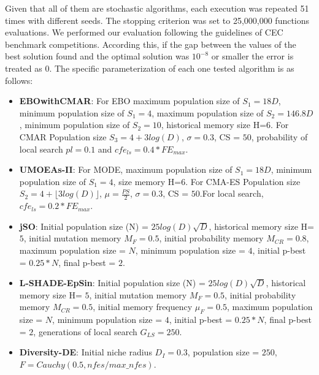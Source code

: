 Given that all of them are stochastic algorithms, each execution was repeated 51 times with different seeds.
%
The stopping criterion was set to 25,000,000 functions evaluations.
%
We performed our evaluation following the guidelines of CEC benchmark competitions.
%
According this, if the gap between the values of the best solution found and the optimal solution was $10^{-8}$ or smaller the error is treated as $0$.
%
%
The specific parameterization of each one tested algorithm is as follows:
\begin{itemize}
\item \textbf{EBOwithCMAR}: For EBO maximum population size of $S_1 = 18D$, minimum population size of $S_1 = 4$, maximum population size of $S_2 = 146.8D$, minimum population size of $S_2 = 10$, historical memory size H=$6$. For CMAR Population size $S_3 = 4 + 3log(D)$, $\sigma=0.3$, CS = $50$, probability of local search $pl = 0.1$ and $cfe_{ls} = 0.4* FE_{max}$.
\item \textbf{UMOEAs-II}: For MODE, maximum population size of $S_1 = 18D$, minimum population size of $S_1 = 4$, size memory H=$6$. For CMA-ES Population size $S_2 = 4 + \lfloor 3log(D) \rfloor$, $\mu=\frac{PS}{2}$, $\sigma=0.3$, CS = $50$.For local search, $cfe_{ls} = 0.2 * FE_{max}$.
\item \textbf{jSO}: Initial population size (N) = $25log(D)\sqrt{D}$, historical memory size H= $5$, initial mutation memory $M_F = 0.5$, initial probability memory $M_{CR} = 0.8$, maximum population size = $N$, minimum population size = $4$, initial p-best = $0.25*N$, final p-best = $2$.
\item \textbf{L-SHADE-EpSin}: Initial population size (N) = $25log(D)\sqrt{D}$, historical memory size H= $5$, initial mutation memory $M_F = 0.5$, initial probability memory $M_{CR} = 0.5$, initial memory frequency $\mu_F = 0.5$, maximum population size = $N$, minimum population size = $4$, initial p-best = $0.25*N$, final p-best = $2$, generations of local search $G_{LS}=250$.
\item \textbf{Diversity-DE}: Initial niche radius $D_I = 0.3$, population size = $250$, $F = Cauchy(0.5, nfes/max\_nfes)$.
\end{itemize}
%

